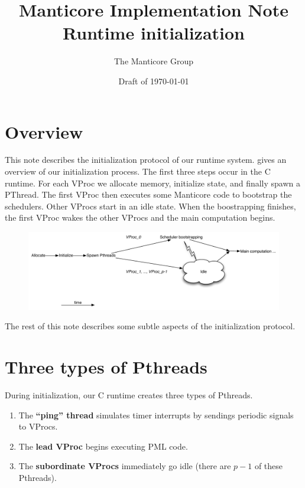 \documentclass[11pt]{article}
\title{Manticore Implementation Note \\ Runtime initialization}
\author{The Manticore Group}
\date{Draft of \today}
\begin{document}
\maketitle

\section{Overview}
This note describes the initialization protocol of our runtime system.  
gives an overview of our initialization process. The first three steps occur in the C runtime. For each VProc
we allocate memory, initialize state, and finally spawn a PThread. The first VProc then 
executes some Manticore code to bootstrap the schedulers. Other VProcs start in an idle state. When the
boostrapping finishes, the first VProc wakes the other VProcs and the main computation begins. 

\begin{figure}[t]
  \includegraphics[scale=0.45]{pictures/runtime-initialization.pdf}
  \label{fig:runtime-initialization}
\end{figure}

The rest of this note describes some subtle aspects of the initialization protocol.

\section{Three types of Pthreads}
During initialization, our C runtime creates three types of Pthreads.
\begin{enumerate}
  \item The \textbf{``ping'' thread} simulates timer interrupts by sendings periodic signals to VProcs.
  \item The \textbf{lead VProc} begins executing PML code.
  \item The \textbf{subordinate VProcs} immediately go idle (there are $p-1$ of these Pthreads).
\end{enumerate}
\end{document}

